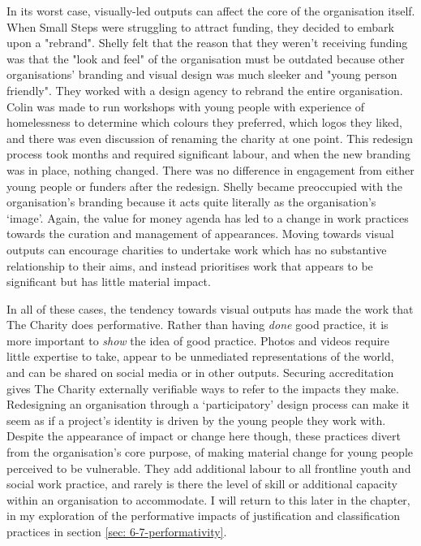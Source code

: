 In its worst case, visually-led outputs can affect the core of the organisation itself. When Small Steps were struggling to attract funding, they decided to embark upon a "rebrand". Shelly felt that the reason that they weren't receiving funding was that the "look and feel" of the organisation must be outdated because other organisations' branding and visual design was much sleeker and "young person friendly". They worked with a design agency to rebrand the entire organisation. Colin was made to run workshops with young people with experience of homelessness to determine which colours they preferred, which logos they liked, and there was even discussion of renaming the charity at one point. This redesign process took months and required significant labour, and  when the new branding was in place, nothing changed. There was no difference in engagement from either young people or funders after the redesign. Shelly became preoccupied with the organisation's branding because it acts quite literally as the organisation's `image'. Again, the value for money agenda has led to a change in work practices towards the curation and management of appearances. Moving towards visual outputs can encourage charities to undertake work which has no substantive relationship to their aims, and instead prioritises work that appears to be significant but has little material impact.

In all of these cases, the tendency towards visual outputs has made the work that The Charity does performative. Rather than having \emph{done} good practice, it is more important to \emph{show} the idea of good practice. Photos and videos require little expertise to take, appear to be unmediated representations of the world, and can be shared on social media or in other outputs. Securing accreditation gives The Charity externally verifiable ways to refer to the impacts they make. Redesigning an organisation through a `participatory' design process can make it seem as if a project's identity is driven by the young people they work with. Despite the appearance of impact or change here though, these practices divert from the organisation's core purpose, of making material change for young people perceived to be vulnerable. They add additional labour to all frontline youth and social work practice, and rarely is there the level of skill or additional capacity within an organisation to accommodate. I will return to this later in the chapter, in my exploration of the performative impacts of justification and classification practices in section \ref{sec: 6-7-performativity}. 

